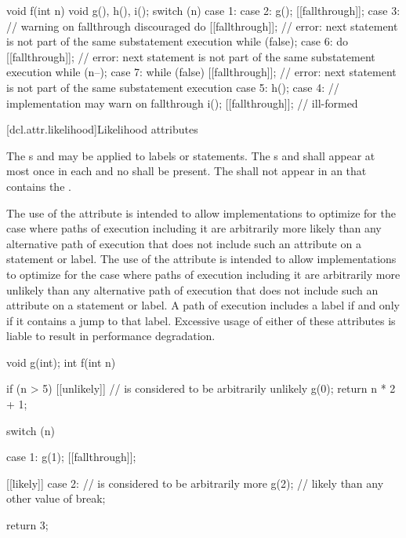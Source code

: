 \pnum
\begin{example}
\begin{codeblock}
void f(int n) {
  void g(), h(), i();
  switch (n) {
  case 1:
  case 2:
    g();
    [[fallthrough]];
  case 3:                       // warning on fallthrough discouraged
    do {
      [[fallthrough]];          // error: next statement is not part of the same substatement execution
    } while (false);
  case 6:
    do {
      [[fallthrough]];          // error: next statement is not part of the same substatement execution
    } while (n--);
  case 7:
    while (false) {
      [[fallthrough]];          // error: next statement is not part of the same substatement execution
    }
  case 5:
    h();
  case 4:                       // implementation may warn on fallthrough
    i();
    [[fallthrough]];            // ill-formed
  }
}
\end{codeblock}
\end{example}

[dcl.attr.likelihood]{Likelihood attributes}%

\pnum
The s
 and 
may be applied to labels or statements.
The s
 and 
shall appear at most once in each 
and no  shall be present.
The  
shall not appear in an 
that contains the  .

\pnum
\begin{note}
The use of the  attribute
is intended to allow implementations to optimize for
the case where paths of execution including it
are arbitrarily more likely
than any alternative path of execution
that does not include such an attribute on a statement or label.
The use of the  attribute
is intended to allow implementations to optimize for
the case where paths of execution including it
are arbitrarily more unlikely
than any alternative path of execution
that does not include such an attribute on a statement or label.
A path of execution includes a label
if and only if it contains a jump to that label.
Excessive usage of either of these attributes
is liable to result in performance degradation.
\end{note}

\pnum
\begin{example}
\begin{codeblock}
void g(int);
int f(int n) {
  if (n > 5) [[unlikely]] {     //  is considered to be arbitrarily unlikely
    g(0);
    return n * 2 + 1;
  }

  switch (n) {
  case 1:
    g(1);
    [[fallthrough]];

  [[likely]] case 2:            //  is considered to be arbitrarily more
    g(2);                       // likely than any other value of 
    break;
  }
  return 3;
}
\end{codeblock}
\end{example}

